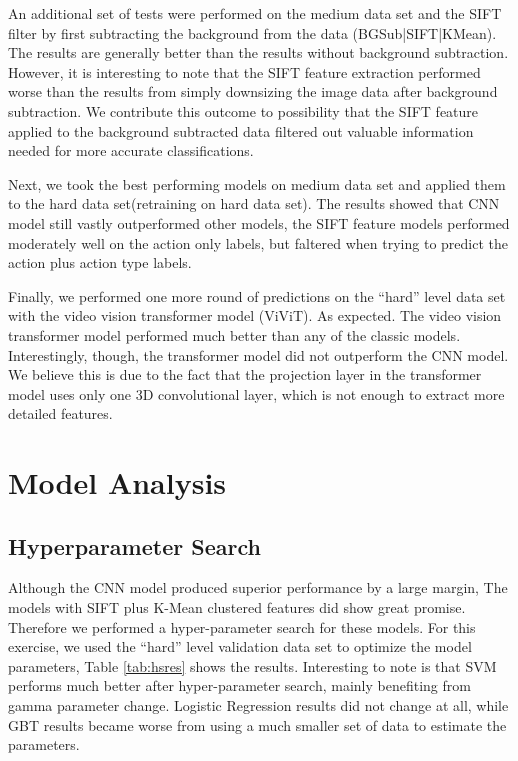 \documentclass[
	a4paper, %
	10pt, %
	unnumberedsections, %
	twoside, %
]{t0004}
\begin{document}
An additional set of tests were performed on the medium data set and the SIFT filter by first subtracting the background from the data (BGSub|SIFT|KMean). The results are generally better than the results without background subtraction. However, it is interesting to note that the SIFT feature extraction performed worse than the results from simply downsizing the image data after background subtraction. We contribute this outcome to possibility that the SIFT feature applied to the background subtracted data filtered out valuable information needed for more accurate classifications.

Next, we took the best performing models on medium data set and applied them to the hard data set(retraining on hard data set). The results showed that CNN model still vastly outperformed other models, the SIFT feature models performed moderately well on the action only labels, but faltered when trying to predict the action plus action type labels.

Finally, we performed one more round of predictions on the ``hard'' level data set with the video vision transformer model (ViViT). As expected. The video vision transformer model performed much better than any of the classic models. Interestingly, though, the transformer model did not outperform the CNN model. We believe this is due to the fact that the projection layer in the transformer model uses only one 3D convolutional layer, which is not enough to extract more detailed features.

\section{Model Analysis}

\subsection{Hyperparameter Search}

Although the CNN model produced superior performance by a large margin, The models with SIFT plus K-Mean clustered features did show great promise. Therefore we performed a hyper-parameter search for these models. For this exercise, we used the ``hard'' level validation data set to optimize the model parameters, Table \ref{tab:hsres} shows the results. Interesting to note is that SVM performs much better after hyper-parameter search, mainly benefiting from gamma parameter change. Logistic Regression results did not change at all, while GBT results became worse from using a much smaller set of data to estimate the parameters.
\end{document}

